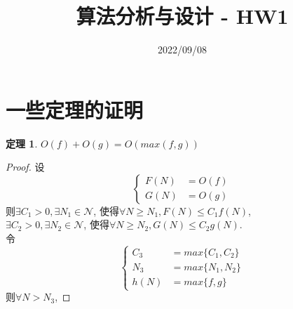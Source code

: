 \documentclass[a4paper]{ctexart}
\title{算法分析与设计 - HW1}
\author{}
\date{2022/09/08}
\begin{document}
\begin{sloppypar}  %

    \maketitle

    \section{一些定理的证明}
    \vspace{1em}  %

    \newtheorem{theorem}{\bf 定理}

    \begin{theorem}
        $O(f) + O(g) = O(max(f, g))$
    \end{theorem}
    \begin{proof}
        设
        \begin{equation}
            \left\{
            \begin{aligned}
                \nonumber
                F(N) & = O(f) \\
                G(N) & = O(g)
            \end{aligned}
            \right.
        \end{equation}
        则$\exists C_1 > 0, \exists N_1 \in \mathcal{N}$,
        使得$\forall N \geq N_1, F(N) \leq C_1f(N)$,\\
        $\exists C_2 > 0, \exists N_2 \in \mathcal{N}$,
        使得$\forall N \geq N_2, G(N) \leq C_2g(N)$.\\
        令
        \begin{equation}
            \left\{
            \begin{aligned}
                \nonumber
                C_3  & = max\{C_1, C_2\} \\
                N_3  & = max\{N_1, N_2\} \\
                h(N) & = max\{f, g\}
            \end{aligned}
            \right.
        \end{equation}
        则$\forall N > N_3$,

\end{proof}
\end{sloppypar}
\end{document}

